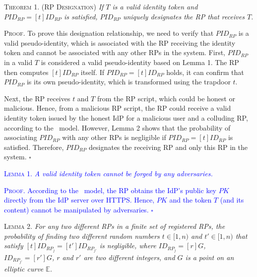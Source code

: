 \vspace{1mm}
\noindent\textsc{Theorem 1. (RP Designation)} {\em If $T$ is a valid identity token and $PID_{RP} = [t]ID_{RP}$ is satisfied, $PID_{RP}$ uniquely designates the RP that receives $T$.}

\vspace{0.75mm}
\noindent\textsc{Proof.} To prove this designation relationship, we need to verify that $PID_{RP}$ is a valid pseudo-identity, which is associated with the RP receiving the identity token and cannot be associated with any other RPs in the system.
First, $PID_{RP}$ in a valid $T$ is considered a valid pseudo-identity based on Lemma 1. The RP then computes $[t]ID_{RP}$ itself. If $PID_{RP} = [t]ID_{RP}$ holds, it can confirm that $PID_{RP}$ is its own pseudo-identity, which is transformed using the trapdoor $t$.

Next, the RP receives $t$ and $T$ from the RP script, which could be honest or malicious. Hence, from a malicious RP script, the RP could receive a valid identity token issued by the honest IdP for a malicious user and a colluding RP, according to the \dy~model. However, Lemma 2 shows that the probability of associating $PID_{RP}$ with any other RPs is negligible if $PID_{RP} = [t]ID_{RP}$ is satisfied. Therefore, $PID_{RP}$ designates the receiving RP and only this RP in the system.  \hfill $\square$

\vspace{1mm}
\noindent\textcolor{blue}{\textsc{Lemma 1.} {\em A valid identity token cannot be forged by any adversaries.}}

\vspace{0.75mm}
\noindent\textcolor{blue}{\textsc{Proof.} According to the \dy~model, the RP obtains the IdP's public key $PK$ directly from the IdP server over HTTPS. Hence, $PK$ and the token $T$ (and its content) cannot be manipulated by adversaries. \hfill $\square$}


\vspace{1mm}
\noindent\textsc{Lemma 2.} {\em  For any two different RPs in a finite set of registered RPs, the probability of finding two different random numbers $t \in [1,n)$ and $t' \in [1,n)$ that satisfy $[t]ID_{RP_j} = [t']ID_{RP_{j'}}$ is negligible, where $ID_{RP_j}=[r]G$, $ID_{RP_{j'}}=[r']G$, $r$ and $r'$ are two different integers, and $G$ is a point on an elliptic curve $\mathbb{E}$.}

